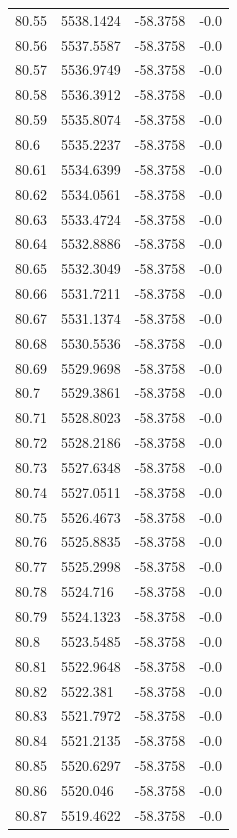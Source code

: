 \begin{table}[H]
\begin{tabular}{llll}
80.55 & 5538.1424 & -58.3758 & -0.0 \\
80.56 & 5537.5587 & -58.3758 & -0.0 \\
80.57 & 5536.9749 & -58.3758 & -0.0 \\
80.58 & 5536.3912 & -58.3758 & -0.0 \\
80.59 & 5535.8074 & -58.3758 & -0.0 \\
80.6 & 5535.2237 & -58.3758 & -0.0 \\
80.61 & 5534.6399 & -58.3758 & -0.0 \\
80.62 & 5534.0561 & -58.3758 & -0.0 \\
80.63 & 5533.4724 & -58.3758 & -0.0 \\
80.64 & 5532.8886 & -58.3758 & -0.0 \\
80.65 & 5532.3049 & -58.3758 & -0.0 \\
80.66 & 5531.7211 & -58.3758 & -0.0 \\
80.67 & 5531.1374 & -58.3758 & -0.0 \\
80.68 & 5530.5536 & -58.3758 & -0.0 \\
80.69 & 5529.9698 & -58.3758 & -0.0 \\
80.7 & 5529.3861 & -58.3758 & -0.0 \\
80.71 & 5528.8023 & -58.3758 & -0.0 \\
80.72 & 5528.2186 & -58.3758 & -0.0 \\
80.73 & 5527.6348 & -58.3758 & -0.0 \\
80.74 & 5527.0511 & -58.3758 & -0.0 \\
80.75 & 5526.4673 & -58.3758 & -0.0 \\
80.76 & 5525.8835 & -58.3758 & -0.0 \\
80.77 & 5525.2998 & -58.3758 & -0.0 \\
80.78 & 5524.716 & -58.3758 & -0.0 \\
80.79 & 5524.1323 & -58.3758 & -0.0 \\
80.8 & 5523.5485 & -58.3758 & -0.0 \\
80.81 & 5522.9648 & -58.3758 & -0.0 \\
80.82 & 5522.381 & -58.3758 & -0.0 \\
80.83 & 5521.7972 & -58.3758 & -0.0 \\
80.84 & 5521.2135 & -58.3758 & -0.0 \\
80.85 & 5520.6297 & -58.3758 & -0.0 \\
80.86 & 5520.046 & -58.3758 & -0.0 \\
80.87 & 5519.4622 & -58.3758 & -0.0 \\

\end{tabular}
\end{table}

